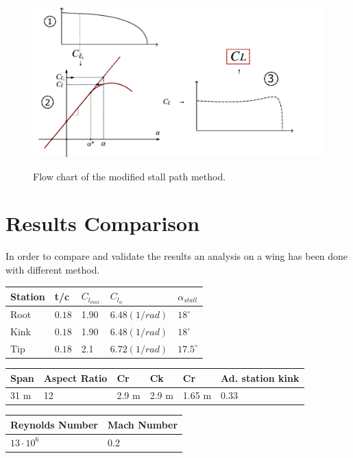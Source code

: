 \begin{figure}[H]
	\centering
	{\includegraphics[height=9 cm]{Immagini/stallpathmodified.pdf}} 
	\caption{Flow chart of the modified stall path method.}
	\label{fig:spmm}
\end{figure}

\section{Results Comparison}
In order to compare and validate the results an analysis on a wing has been done with different method.

\begin{center}
	\begin{tabular}{| l | l | l | l | l |}
		\hline
		 Station & t/c & $C_{l_{max}}$ & $C_{l_{\alpha}}$ & $\alpha_{stall}$ \\ \hline
		 Root & $0.18$ &  1.90  &  $6.48 (1/rad)$ & $ 18^{\circ} $  \\ \hline
		 Kink & $0.18$ & 1.90  &  $6.48 (1/rad)$ & $ 18^{\circ} $  \\ \hline
		 Tip & $0.18$ &  2.1  &  $6.72 (1/rad)$ & $ 17.5^{\circ} $  \\ \hline
		\hline
	\end{tabular}
\end{center}
\begin{center}
	\begin{tabular}{| l | l | l | l | l |  l |}
		\hline
		  Span & Aspect Ratio & Cr & Ck & Cr & Ad. station kink  \\ \hline
		  31  m & 12 & 2.9 m & 2.9 m & 1.65 m & 0.33\\ \hline
		\hline
	\end{tabular}
\end{center}
\begin{center}
	\begin{tabular}{| l | l |}
		\hline
		  Reynolds Number & Mach Number\\ \hline
		  $13 \cdot 10^6$  & 0.2   \\ \hline
		\hline
	\end{tabular}
\end{center}


